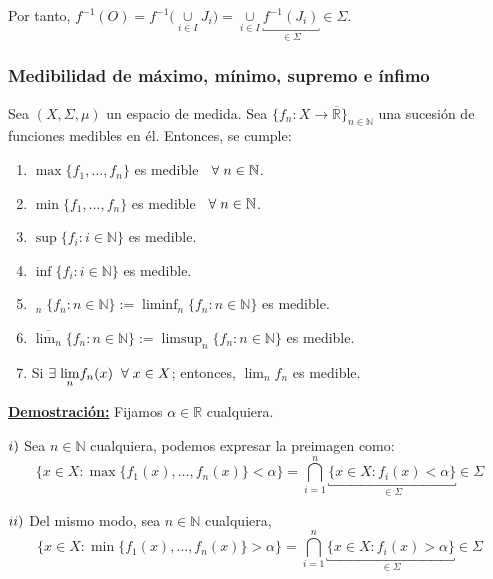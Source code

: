 \documentclass[12pt,a4paper]{article}
\newcommand{\R}{\mathbb{R}}
\newcommand{\N}{\mathbb{N}}
\newcommand{\smallcup}{\mathop{\cup}\limits}
\newcommand{\linf}[1]{\displaystyle{\mathop{\underline{\lim}}_{#1}}}
\newcommand{\mlim}[1]{\displaystyle{\lim_{#1}}}
\newcounter{unit}[section]
\newcounter{chapter}[unit]
\renewcommand{\theunit}{\arabic{unit}}
\renewcommand{\thechapter}{\arabic{chapter}}
\renewcommand{\thesubsubsection}{\theunit.\thechapter.\arabic{subsubsection}}
\newcommand{\result}[1]{%
  \subsubsection{#1}%
  \label{result:\thesubsubsection}
}
\newcommand{\dem}{
    \noindent \underline{\textbf{Demostración:}}
}
\begin{document}
\vspace{2mm}
\noindent Por tanto, $f^{-1}(O) = f^{-1}\Big(\smallcup_{i\in I}J_i\Big) = \smallcup_{i\in I} \underbracket{f^{-1}(J_i)}_{\in\Sigma} \in \Sigma$.

\result{Medibilidad de máximo, mínimo, supremo e ínfimo}
\hspace{3mm} Sea $(X, \Sigma, \mu)$ un espacio de medida. Sea $\{f_n : X \to \overline{\R}\}_{n\in\N}$ una sucesión de funciones medibles en él. Entonces, se cumple:
\begin{enumerate}[label=\roman*)]
    \item $\max \{f_1, \ldots, f_n\}$ es medible $\hspace{2mm} \forall \hspace{1mm} n \in \N$.
    \item $\min \{f_1, \ldots, f_n\}$ es medible $\hspace{2mm} \forall \hspace{1mm} n \in \N$.
    \item $\sup \{f_i : i \in \N\}$ es medible.
    \item $\inf \{f_i : i \in \N\}$ es medible.
    \item $\linf{n} \{f_n : n \in \N\} := \liminf_n \{f_n : n \in \N\}$ es medible.
    \item $\displaystyle \overline{\lim_n} \{f_n : n \in \N\} := \limsup_n \{f_n : n \in \N\}$ es medible.
    \item Si $\exists \hspace{1mm} \mlim{n} f_n(x)  \hspace{2mm} \forall \hspace{1mm} x \in X$; entonces, $\mlim{n} f_n$ es medible.
\end{enumerate}

\vspace{2mm}
\dem Fijamos $\alpha \in \R$ cualquiera.

\vspace{2mm}
$\romannumeral 1)$ Sea $n \in \N$ cualquiera, podemos expresar la preimagen como:
\\[-2ex] $$ \Big\{x \in X : \max \{f_1(x), \ldots , f_n(x)\} < \alpha \Big\} = \bigcap_{i=1}^n \underbracket{\{x  \in X : f_i(x) < \alpha\}}_{\in \Sigma} \in \Sigma$$

\vspace{2mm}
$\romannumeral 2)$ Del mismo modo, sea $n \in \N$ cualquiera,
\\[-2ex] $$ \Big\{x \in X : \min \{f_1(x), \ldots , f_n(x)\} > \alpha \Big\} = \bigcap_{i=1}^n \underbracket{\{x  \in X : f_i(x) > \alpha\}}_{\in \Sigma} \in \Sigma$$
\end{document}
